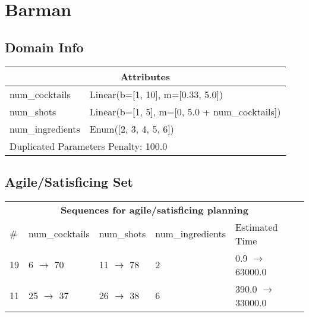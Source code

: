 \documentclass{article}
\begin{document}
        \newpage \section{Barman}
                    \subsection*{Domain Info}

                    \begin{center}
                    \begin{tabular}{p{}p{}}
                    \multicolumn{2}{c}{\bf \large Attributes}\\\midrule
                    num\_cocktails & Linear(b=[1, 10], m=[0.33, 5.0])\\
num\_shots & Linear(b=[1, 5], m=[0, 5.0 + num\_cocktails])\\
num\_ingredients & Enum([2, 3, 4, 5, 6])
                    
                     \\\midrule
                    \multicolumn{2}{l}{Duplicated Parameters Penalty: 100.0}
                    \end{tabular}
                    \end{center}
                
                         \subsection*{Agile/Satisficing Set}

                        \begin{center}
                        \begin{tabular}{l|l|l|l|l}
                        \multicolumn{5}{c}{\bf \large Sequences for agile/satisficing planning}\\
                        \# & num\_cocktails & num\_shots & num\_ingredients & Estimated Time\\\midrule
                        19&6 $\rightarrow$ 70&11 $\rightarrow$ 78&2&0.9 $\rightarrow$ 63000.0\\
11&25 $\rightarrow$ 37&26 $\rightarrow$ 38&6&390.0 $\rightarrow$ 33000.0
                        \end{tabular}
                        \end{center}
                    
\end{document}
